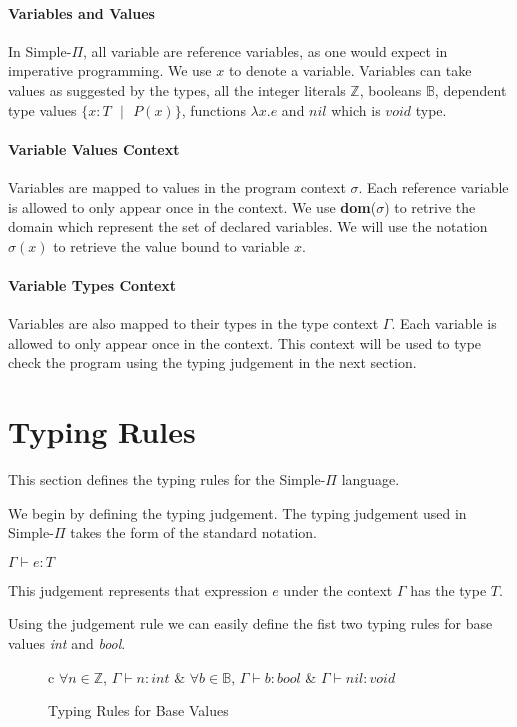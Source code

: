 \documentclass[a4paper,12pt]{report}
\begin{document}
\paragraph{Variables and Values} In Simple-$\Pi$, all variable are reference 
variables, as one would expect in imperative programming. We use $x$ to denote a 
variable. Variables can take values as suggested by the types, all the integer 
literals $\mathbb{Z}$, booleans $\mathbb{B}$, dependent type values 
$\{x: T\text{ }|\text{ }P(x)\}$, functions $\lambda x.e$ and $nil$ 
which is $void$ type.

\paragraph{Variable Values Context} Variables are mapped to values in the program 
context $\sigma$. Each reference variable is allowed to only appear once in 
the context. We use \textbf{dom}($\sigma$) to retrive the domain which represent 
the set of declared variables. We will use the notation $\sigma(x)$ 
to retrieve the value bound to variable $x$.

\paragraph{Variable Types Context} Variables are also mapped to their types 
in the type context $\Gamma$. Each variable is allowed to only appear once in 
the context. This context will be used to type check the program using the 
typing judgement in the next section.

\section{Typing Rules}
This section defines the typing rules for the Simple-$\Pi$ language.

\par
We begin by defining the typing judgement. The typing judgement used in 
Simple-$\Pi$ takes the form of the standard notation. 
\begin{center}
  $\Gamma \vdash e : T$
\end{center}
This judgement represents that expression $e$ under the context $\Gamma$ has the 
type $T$.

\par
Using the judgement rule we can easily define the fist two typing rules for base 
values \textit{int} and \textit{bool}.

\begin{figure}[H]
  \begin{center}
    \begin{tabular} {c}
      $\forall n \in \mathbb{Z}$, $\Gamma \vdash n : int$ & 
      $\forall b \in \mathbb{B}$, $\Gamma \vdash b : bool$ & 
      $\Gamma \vdash nil : void$      
    \end{tabular}
  \end{center}
  \caption{Typing Rules for Base Values}
\end{figure}
\end{document}
